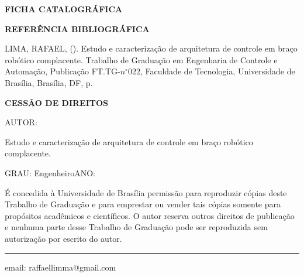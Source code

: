 \noindent \textbf{FICHA CATALOGRÁFICA}

\noindent %

\noindent \medskip{}


\noindent \textbf{REFERÊNCIA BIBLIOGRÁFICA}

LIMA, RAFAEL, (\the\year). Estudo e caracterização de arquitetura de controle em braço robótico complacente. Trabalho de Graduação
em Engenharia de Controle e Automação, Publicação FT.TG-$n^{\circ}022$,
Faculdade de Tecnologia, Universidade de Brasília, Brasília, DF, \pageref{LastPage}p.

\noindent \bigskip{}


\noindent \textbf{CESSÃO DE DIREITOS}

\noindent AUTOR: \autorinome

Estudo e caracterização de arquitetura de controle em braço robótico complacente.

\noindent \medskip{}


\noindent GRAU: Engenheiro\hfill{}ANO: \the\year\hfill{}

\noindent \medskip{}


É concedida à Universidade de Brasília permissão para reproduzir cópias
deste Trabalho de Graduação e para emprestar ou vender tais cópias
somente para propósitos acadêmicos e científicos. O autor reserva
outros direitos de publicação e nenhuma parte desse Trabalho de Graduação
pode ser reproduzida sem autorização por escrito do autor.

\noindent \bigskip{}


\noindent \rule[0.5ex]{1\columnwidth}{1pt}

\noindent \autorinome

email: raffaellimma@gmail.com


